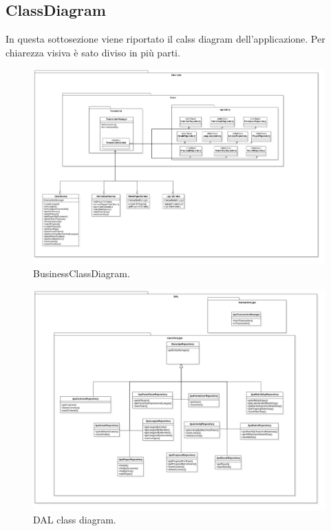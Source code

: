 \subsection{ClassDiagram}
In questa sottosezione viene riportato il calss diagram dell'applicazione. Per chiarezza visiva
è sato diviso in più parti.
\begin{figure}
    \centering
    \includegraphics[width=\textwidth]{Resources/graficiUML/BusinessClassDiagram.png}        
    \caption{BusinessClassDiagram.}
    \label{fig:business_class_diagram}
\end{figure}
\begin{figure}
    \centering
    \includegraphics[width=\textwidth]{Resources/graficiUML/DALClassDiagram.png}        
    \caption{DAL class diagram.}
    \label{fig:dal_class_diagram}
\end{figure}
